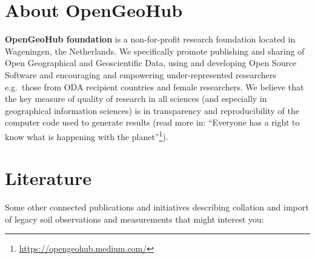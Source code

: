 \documentclass[
  graybox,natbib,nospthms]{svmono}
\renewcommand{\href}[2]{#2 (\url{#1})}
\renewcommand{\href}[2]{#2\footnote{\url{#1}}}
\begin{document}
\hypertarget{about-opengeohub}{%
\section{About OpenGeoHub}\label{about-opengeohub}}

\textbf{OpenGeoHub foundation} is a non-for-profit research foundation
located in Wageningen, the Netherlands. We specifically promote
publishing and sharing of Open Geographical and Geoscientific Data,
using and developing Open Source Software and encouraging and empowering
under-represented researchers e.g.~those from ODA recipient countries
and female researchers. We believe that the key measure of quality of
research in all sciences (and especially in geographical information
sciences) is in transparency and reproducibility of the computer code
used to generate results (read more in: \href{https://opengeohub.medium.com/}{``Everyone has a right to know
what is happening with the planet''}).

\hypertarget{literature}{%
\section{Literature}\label{literature}}

Some other connected publications and initiatives describing collation
and import of legacy soil observations and measurements that might interest
you:
\end{document}
